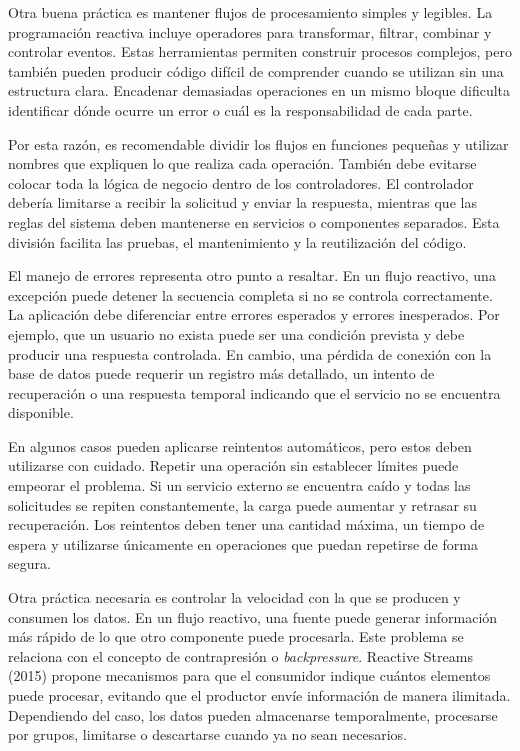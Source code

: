\documentclass[12pt,letterpaper]{article}
\begin{document}
Otra buena práctica es mantener flujos de procesamiento simples y legibles. La programación reactiva incluye operadores para transformar, filtrar, combinar y controlar eventos. Estas herramientas permiten construir procesos complejos, pero también pueden producir código difícil de comprender cuando se utilizan sin una estructura clara. Encadenar demasiadas operaciones en un mismo bloque dificulta identificar dónde ocurre un error o cuál es la responsabilidad de cada parte.

Por esta razón, es recomendable dividir los flujos en funciones pequeñas y utilizar nombres que expliquen lo que realiza cada operación. También debe evitarse colocar toda la lógica de negocio dentro de los controladores. El controlador debería limitarse a recibir la solicitud y enviar la respuesta, mientras que las reglas del sistema deben mantenerse en servicios o componentes separados. Esta división facilita las pruebas, el mantenimiento y la reutilización del código.

El manejo de errores representa otro punto a resaltar. En un flujo reactivo, una excepción puede detener la secuencia completa si no se controla correctamente. La aplicación debe diferenciar entre errores esperados y errores inesperados. Por ejemplo, que un usuario no exista puede ser una condición prevista y debe producir una respuesta controlada. En cambio, una pérdida de conexión con la base de datos puede requerir un registro más detallado, un intento de recuperación o una respuesta temporal indicando que el servicio no se encuentra disponible.

En algunos casos pueden aplicarse reintentos automáticos, pero estos deben utilizarse con cuidado. Repetir una operación sin establecer límites puede empeorar el problema. Si un servicio externo se encuentra caído y todas las solicitudes se repiten constantemente, la carga puede aumentar y retrasar su recuperación. Los reintentos deben tener una cantidad máxima, un tiempo de espera y utilizarse únicamente en operaciones que puedan repetirse de forma segura.

Otra práctica necesaria es controlar la velocidad con la que se producen y consumen los datos. En un flujo reactivo, una fuente puede generar información más rápido de lo que otro componente puede procesarla. Este problema se relaciona con el concepto de contrapresión o \textit{backpressure}. Reactive Streams (2015) propone mecanismos para que el consumidor indique cuántos elementos puede procesar, evitando que el productor envíe información de manera ilimitada. Dependiendo del caso, los datos pueden almacenarse temporalmente, procesarse por grupos, limitarse o descartarse cuando ya no sean necesarios.
\end{document}
